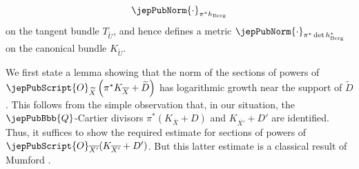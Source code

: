 $$\jepPubNorm{\cdot}_{\pi^\ast h_{\mathrm{Berg}}}$$
on the tangent bundle $T_{\widetilde{U}}$, and hence defines a metric $\jepPubNorm{\cdot}_{ \pi^\ast \det h^\ast_{\mathrm{Berg}}}$ on the canonical bundle $K_{\widetilde{U}}$.

We first state a lemma showing that the norm of the sections of powers of $\jepPubScript{O}_{\widetilde{X}} \left( \pi^\ast K_{\overline{X}} + \widetilde{D} \right)$ has logarithmic growth near the support of $\widetilde{D}$. This follows from the simple observation that, in our situation, the $\jepPubBbb{Q}$-Cartier divisors $\pi^{\ast} \left( K_{\overline{X}} + D \right)$  and $K_{\overline{X'}} + D'$ are identified. Thus, it suffices to show the required estimate for sections of powers of $\jepPubScript{O}_{\overline{X'}} (K_{\overline{X'}} + D')$. But this latter estimate is a classical result of Mumford \cite{pubref23}.   

